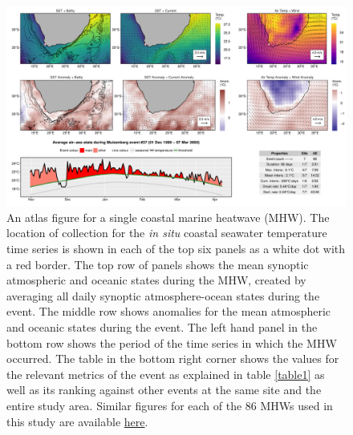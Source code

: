 \documentclass[utf8]{frontiersSCNS}
\begin{document}
\begin{figure}[]
\begin{center}
\includegraphics[width=1.0\textwidth]{figure_2.pdf}
\end{center}
\caption{An atlas figure for a single coastal marine heatwave (MHW). The location of collection for the \emph{in situ} coastal seawater temperature time series is shown in each of the top six panels as a white dot with a red border. The top row of panels shows the mean synoptic atmospheric and oceanic states during the MHW, created by averaging all daily synoptic atmosphere-ocean states during the event. The middle row shows anomalies for the mean atmospheric and oceanic states during the event. The left hand panel in the bottom row shows the period of the time series in which the MHW occurred. The table in the bottom right corner shows the values for the relevant metrics of the event as explained in table \ref{table1} as well as its ranking against other events at the same site and the entire study area. Similar figures for each of the 86 MHWs used in this study are available \href{https://github.com/schrob040/AHW/tree/master/graph/synoptic}{here}.}
\label{figure2}
\end{figure}
\end{document}
